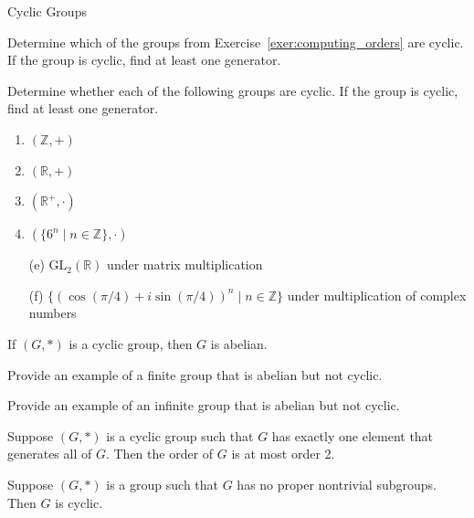 \begin{section}{Cyclic Groups}
\begin{exercise}
Determine which of the groups from Exercise~\ref{exer:computing_orders} are cyclic.  If the group is cyclic, find at least one generator.
\end{exercise}

\begin{exercise}
Determine whether each of the following groups are cyclic.  If the group is cyclic, find at least one generator.
\begin{multicols}{2}
\begin{enumerate}[label=\rm{(\alph*)}]
\item $(\mathbb{Z},+)$
\item $(\mathbb{R},+)$
\item $(\mathbb{R}^+,\cdot)$
\item $(\{6^n\mid n\in\mathbb{Z}\},\cdot)$
\end{enumerate}
\end{multicols}
\begin{enumerate}
\item[(e)] $\textrm{GL}_2(\mathbb{R})$ under matrix multiplication
\item[(f)] $\{(\cos(\pi/4) +i\sin(\pi/4))^n\mid n\in \mathbb{Z}\}$ under multiplication of complex numbers
\end{enumerate}
\end{exercise}

\begin{theorem}
If $(G,*)$ is a cyclic group, then $G$ is abelian.
\end{theorem}

\begin{exercise}
Provide an example of a finite group that is abelian but not cyclic.
\end{exercise}

\begin{exercise}
Provide an example of an infinite group that is abelian but not cyclic.
\end{exercise}

\begin{theorem}
Suppose $(G,*)$ is a cyclic group such that $G$ has exactly one element that generates all of $G$.  Then the order of $G$ is at most order 2.   
\end{theorem}

\begin{theorem}
Suppose $(G,*)$ is a group such that $G$ has no proper nontrivial subgroups.  Then $G$ is cyclic.
\end{theorem}


\end{section}
